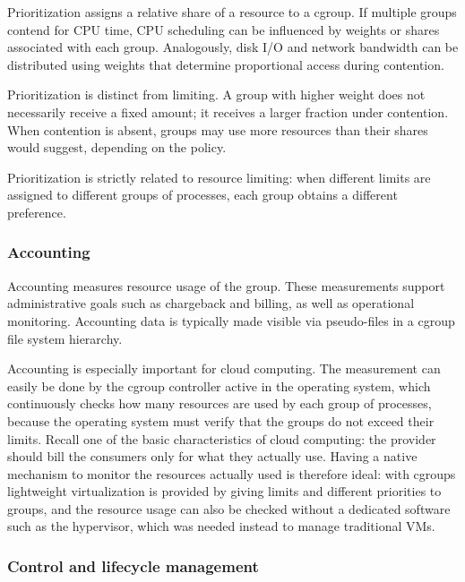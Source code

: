 Prioritization assigns a relative share of a resource to a cgroup. If multiple groups contend for CPU time, CPU scheduling can be influenced by weights or shares associated with each group. Analogously, disk I/O and network bandwidth can be distributed using weights that determine proportional access during contention.

Prioritization is distinct from limiting. A group with higher weight does not necessarily receive a fixed amount; it receives a larger fraction under contention. When contention is absent, groups may use more resources than their shares would suggest, depending on the policy.

Prioritization is strictly related to resource limiting: when different limits are assigned to different groups of processes, each group obtains a different preference.

\subsubsection*{Accounting}

Accounting measures resource usage of the group. These measurements support administrative goals such as chargeback and billing, as well as operational monitoring. Accounting data is typically made visible via pseudo-files in a cgroup file system hierarchy.

Accounting is especially important for cloud computing. The measurement can easily be done by the cgroup controller active in the operating system, which continuously checks how many resources are used by each group of processes, because the operating system must verify that the groups do not exceed their limits. Recall one of the basic characteristics of cloud computing: the provider should bill the consumers only for what they actually use. Having a native mechanism to monitor the resources actually used is therefore ideal: with cgroups lightweight virtualization is provided by giving limits and different priorities to groups, and the resource usage can also be checked without a dedicated software such as the hypervisor, which was needed instead to manage traditional VMs.

\subsubsection*{Control and lifecycle management}

